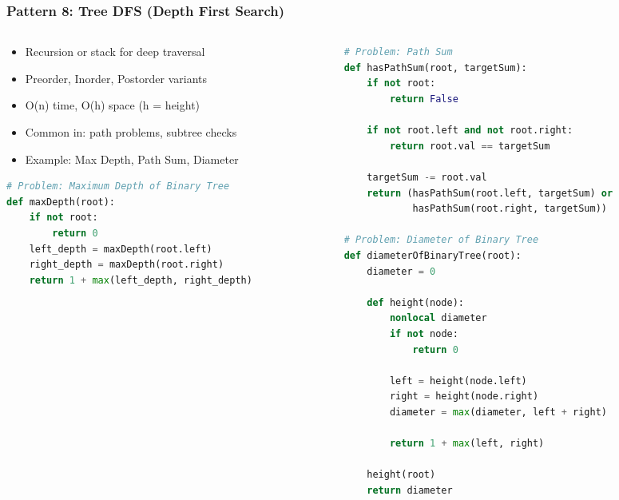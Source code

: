 \begin{frame}[fragile]\frametitle{Pattern 8: Tree DFS (Depth First Search)}

\begin{columns}
    \begin{column}[T]{0.6\linewidth}
      \begin{itemize}
        \item Recursion or stack for deep traversal
        \item Preorder, Inorder, Postorder variants
        \item O(n) time, O(h) space (h = height)
        \item Common in: path problems, subtree checks
        \item Example: Max Depth, Path Sum, Diameter
      \end{itemize}
	  
     \begin{lstlisting}[language=python, basicstyle=\tiny]
# Problem: Maximum Depth of Binary Tree
def maxDepth(root):
    if not root:
        return 0
    left_depth = maxDepth(root.left)
    right_depth = maxDepth(root.right)
    return 1 + max(left_depth, right_depth)
      \end{lstlisting}

    \end{column}
    \begin{column}[T]{0.4\linewidth}
      \begin{lstlisting}[language=python, basicstyle=\tiny]
# Problem: Path Sum
def hasPathSum(root, targetSum):
    if not root:
        return False
    
    if not root.left and not root.right:
        return root.val == targetSum
    
    targetSum -= root.val
    return (hasPathSum(root.left, targetSum) or 
            hasPathSum(root.right, targetSum))

# Problem: Diameter of Binary Tree
def diameterOfBinaryTree(root):
    diameter = 0
    
    def height(node):
        nonlocal diameter
        if not node:
            return 0
        
        left = height(node.left)
        right = height(node.right)
        diameter = max(diameter, left + right)
        
        return 1 + max(left, right)
    
    height(root)
    return diameter
      \end{lstlisting}

    \end{column}
  \end{columns}
\end{frame}

